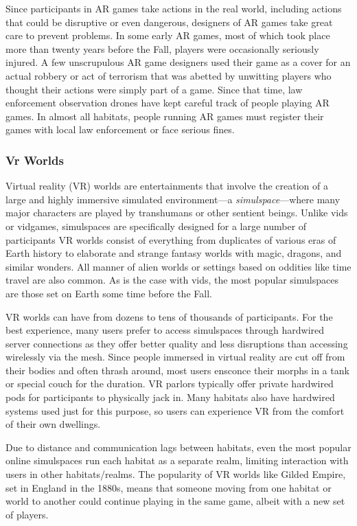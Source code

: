 Since participants in AR games take actions in the 
real world, including actions that could be disruptive 
or even dangerous, designers of AR games take great 
care to prevent problems. In some early AR games, 
most of which took place more than twenty years 
before the Fall, players were occasionally seriously 
injured. A few unscrupulous AR game designers used 
their game as a cover for an actual robbery or act 
of terrorism that was abetted by unwitting players 
who thought their actions were simply part of a game. 
Since that time, law enforcement observation drones 
have kept careful track of people playing AR games. 
In almost all habitats, people running AR games must 
register their games with local law enforcement or 
face serious fines.

\subsubsection{Vr Worlds}

Virtual reality (VR) worlds are entertainments that 
involve the creation of a large and highly immersive 
simulated environment—a \textit{simulspace}—where many 
major characters are played by transhumans or other 
sentient beings. Unlike vids or vidgames, simulspaces 
are specifically designed for a large number of participants
VR worlds consist of everything from duplicates
of various eras of Earth history to elaborate and
strange fantasy worlds with magic, dragons, and similar
wonders. All manner of alien worlds or settings
based on oddities like time travel are also common. As 
is the case with vids, the most popular simulspaces are 
those set on Earth some time before the Fall.

VR worlds can have from dozens to tens of thousands
of participants. For the best experience, many
users prefer to access simulspaces through hardwired 
server connections as they offer better quality and 
less disruptions than accessing wirelessly via the 
mesh. Since people immersed in virtual reality are cut 
off from their bodies and often thrash around, most 
users ensconce their morphs in a tank or special couch 
for the duration. VR parlors typically offer private 
hardwired pods for participants to physically jack in. 
Many habitats also have hardwired systems used just 
for this purpose, so users can experience VR from the 
comfort of their own dwellings.

Due to distance and communication lags between 
habitats, even the most popular online simulspaces 
run each habitat as a separate realm, limiting interaction
with users in other habitats/realms. The popularity
of VR worlds like Gilded Empire, set in England
in the 1880s, means that someone moving from one 
habitat or world to another could continue playing in 
the same game, albeit with a new set of players.

